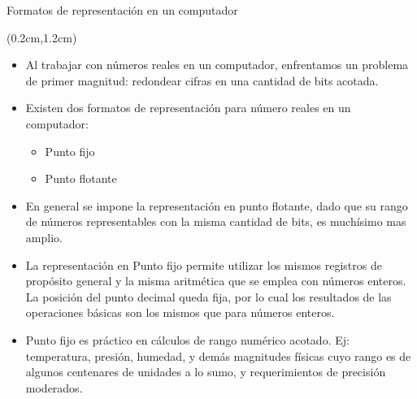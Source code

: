 \begin{frame}{Formatos de representación en un computador}
 \begin{textblock*}{\textwidth}(0.2cm,1.2cm)
  \begin{itemize} [<+(1)->]\justifying
   \item Al trabajar con números reales en un computador, enfrentamos un problema de primer magnitud: redondear cifras en una cantidad de bits acotada.
   \item Existen dos formatos de representación para número reales en un computador:
   \begin{itemize}
    \item Punto fijo
    \item Punto flotante
   \end{itemize}
   \item En general se impone la representación en punto flotante, dado que su rango de números representables con la misma cantidad de bits, es muchísimo mas amplio.
   \item La representación en Punto fijo permite utilizar los mismos registros de propósito general y la misma aritmética que se emplea con números enteros. La posición del punto decimal queda fija, por lo cual los resultados de las operaciones básicas son los mismos que para números enteros.
   \item Punto fijo es práctico en cálculos de rango numérico acotado. Ej: temperatura, presión, humedad, y demás magnitudes físicas cuyo rango es de algunos centenares de unidades a lo sumo, y requerimientos de precisión moderados.
  \end{itemize}
 \end{textblock*}
\end{frame}

